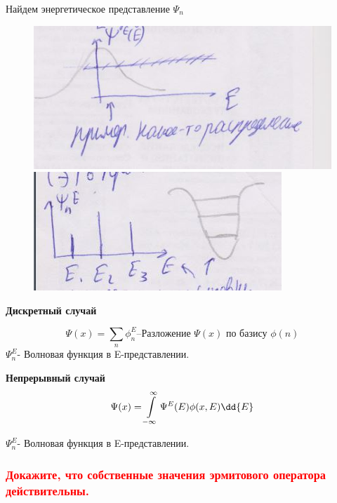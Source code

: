 Найдем энергетическое представление $\Psi_n$
\begin{figure}
\begin{minipage}{0.5\linewidth}
\includegraphics[width=\linewidth]{fig/fig152}
\caption{}
\vspace{-17pt}
\end{minipage}

\begin{minipage}{0.5\linewidth}
\includegraphics[width=\linewidth]{fig/fig151}
\caption{}
\vspace{-17pt}
\end{minipage}
\end{figure}

\textbf{Дискретный случай}

$$\Psi(x)=\sum\limits_n \phi_n^E \text{--Разложение $\Psi(x)$ по базису $\phi(n)$} $$
$\Psi_n^E$- Волновая функция в E-представлении.


\textbf{Непрерывный случай }
$$\Psi(x)=\infint \Psi^E(E)\phi(x,E)\dd{E} $$

$\Psi_n^E$- Волновая функция в E-представлении.

\subsubsection{\textcolor{red} {Докажите, что собственные значения эрмитового оператора действительны.} }

